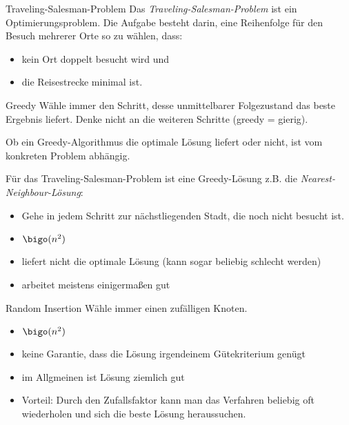 \begin{defi}{Traveling-Salesman-Problem}
    Das \emph{Traveling-Salesman-Problem} ist ein Optimierungsproblem.
    Die Aufgabe besteht darin, eine Reihenfolge für den Besuch mehrerer Orte so zu wählen, dass:
    \begin{itemize}
        \item kein Ort doppelt besucht wird und
        \item die Reisestrecke minimal ist.
    \end{itemize}
\end{defi}

\begin{defi}{Greedy}
    Wähle immer den Schritt, desse unmittelbarer Folgezustand das beste Ergebnis liefert.
    Denke nicht an die weiteren Schritte (greedy = gierig).

    Ob ein Greedy-Algorithmus die optimale Lösung liefert oder nicht, ist vom konkreten Problem abhängig.

    Für das Traveling-Salesman-Problem ist eine Greedy-Lösung z.B. die \emph{Nearest-Neighbour-Lösung}:
    \begin{itemize}
        \item Gehe in jedem Schritt zur nächstliegenden Stadt, die noch nicht besucht ist.
        \item $\bigo(n^2)$
        \item liefert nicht die optimale Lösung (kann sogar beliebig schlecht werden)
        \item arbeitet meistens einigermaßen gut
    \end{itemize}
\end{defi}

\begin{bonus}{Random Insertion}
    Wähle immer einen zufälligen Knoten.

    \begin{itemize}
        \item $\bigo(n^2)$
        \item keine Garantie, dass die Lösung irgendeinem Gütekriterium genügt
        \item im Allgmeinen ist Lösung ziemlich gut
        \item Vorteil: Durch den Zufallsfaktor kann man das Verfahren beliebig oft wiederholen und sich die beste Lösung heraussuchen.
    \end{itemize}
\end{bonus}

